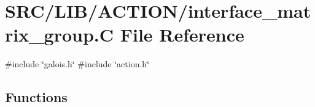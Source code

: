 \hypertarget{interface__matrix__group_8_c}{}\section{S\+R\+C/\+L\+I\+B/\+A\+C\+T\+I\+O\+N/interface\+\_\+matrix\+\_\+group.C File Reference}
\label{interface__matrix__group_8_c}
{\ttfamily \#include \char`\"{}galois.\+h\char`\"{}}\newline
{\ttfamily \#include \char`\"{}action.\+h\char`\"{}}\newline
\subsection*{Functions}
